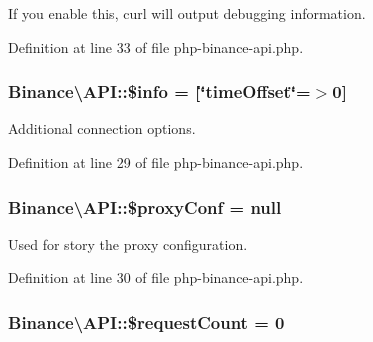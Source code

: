 If you enable this, curl will output debugging information. 



Definition at line 33 of file php-\/binance-\/api.\-php.

\hypertarget{classBinance_1_1API_a8d15ac7cb74ac52f8f008e61aa7cab89}{
\subsubsection[{\$info}]{\setlength{\rightskip}{0pt plus 5cm}Binance\textbackslash{}\-A\-P\-I\-::\$info = \mbox{[}\char`\"{}time\-Offset\char`\"{}=$>$0\mbox{]}\hspace{0.3cm}{\ttfamily [protected]}}}\label{classBinance_1_1API_a8d15ac7cb74ac52f8f008e61aa7cab89}


Additional connection options. 



Definition at line 29 of file php-\/binance-\/api.\-php.

\hypertarget{classBinance_1_1API_a1415587257942c2b5af22c642ff58005}{
\subsubsection[{\$proxy\-Conf}]{\setlength{\rightskip}{0pt plus 5cm}Binance\textbackslash{}\-A\-P\-I\-::\$proxy\-Conf = null\hspace{0.3cm}{\ttfamily [protected]}}}\label{classBinance_1_1API_a1415587257942c2b5af22c642ff58005}


Used for story the proxy configuration. 



Definition at line 30 of file php-\/binance-\/api.\-php.

\hypertarget{classBinance_1_1API_a69a4bfc5a6773dff1d01166dfbb402a2}{
\subsubsection[{\$request\-Count}]{\setlength{\rightskip}{0pt plus 5cm}Binance\textbackslash{}\-A\-P\-I\-::\$request\-Count = 0\hspace{0.3cm}{\ttfamily [protected]}}}\label{classBinance_1_1API_a69a4bfc5a6773dff1d01166dfbb402a2}


